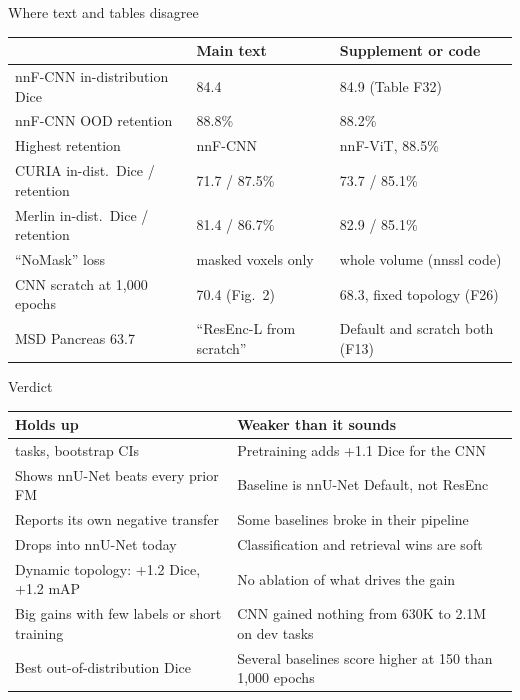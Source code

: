 \documentclass[aspectratio=169,11pt]{beamer}
\newcommand{\best}[1]{{\interbold #1}}
\begin{document}
\begin{frame}{Where text and tables disagree}
\vskip10pt
{\footnotesize\setlength{\tabcolsep}{5pt}
\begin{tabular}{@{}l l l@{}}
\toprule
 & Main text & Supplement or code \\
\midrule
nnF-CNN in-distribution Dice & 84.4 & 84.9 (Table F32) \\
nnF-CNN OOD retention & 88.8\% & 88.2\% \\
Highest retention & nnF-CNN & nnF-ViT, 88.5\% \\
CURIA in-dist.\ Dice / retention & 71.7 / 87.5\% & 73.7 / 85.1\% \\
Merlin in-dist.\ Dice / retention & 81.4 / 86.7\% & 82.9 / 85.1\% \\
``NoMask'' loss & masked voxels only & whole volume (nnssl code) \\
CNN scratch at 1,000 epochs & 70.4 (Fig.\ 2) & 68.3, fixed topology (F26) \\
MSD Pancreas 63.7 & ``ResEnc-L from scratch'' & Default and scratch both (F13) \\
\bottomrule
\end{tabular}}
\end{frame}

\begin{frame}{Verdict}
\vskip14pt
{\footnotesize
\begin{tabular}{@{}>{\raggedright\arraybackslash}p{} >{\raggedright\arraybackslash}p{}@{}}
\toprule
\textcolor{cnn}{\best{Holds up}} & \textcolor{unet!80!ink}{\best{Weaker than it sounds}} \\
\midrule
108 tasks, bootstrap CIs & Pretraining adds +1.1 Dice for the CNN \\
Shows nnU-Net beats every prior FM & Baseline is nnU-Net Default, not ResEnc \\
Reports its own negative transfer & Some baselines broke in their pipeline \\
Drops into nnU-Net today & Classification and retrieval wins are soft \\
Dynamic topology: +1.2 Dice, +1.2 mAP & No ablation of what drives the gain \\
Big gains with few labels or short training & CNN gained nothing from 630K to 2.1M on dev tasks \\
Best out-of-distribution Dice & Several baselines score higher at 150 than 1,000 epochs \\
\bottomrule
\end{tabular}}
\end{frame}
\end{document}
